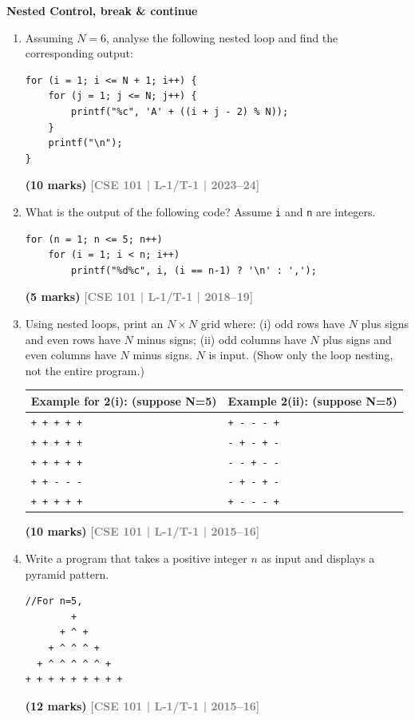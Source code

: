 \documentclass[12pt,a3paper]{article}
\newcommand{\yr}[1]{\hfill\textcolor{gray}{\small\textbf{[#1]}}}
\newcommand{\mk}[1]{\textcolor{orange!70!black}{\small\textbf{(#1 marks)}}}
\newcommand{\subtopic}[2]{%
  \vspace{10pt}
  \noindent\begin{tcolorbox}[colback=#1!8,colframe=#1,boxrule=0.6pt,arc=4pt,
    left=6pt,right=6pt,top=4pt,bottom=4pt]
    \small\bfseries\textcolor{#1}{#2}
  \end{tcolorbox}
  \vspace{2pt}
}
\begin{document}
\subtopic{cA}{Nested Control, break \& continue}
\label{sub:s2-nested}

\begin{enumerate}


\item Assuming $N = 6$, analyse the following nested loop and find the corresponding output:
 
\begin{lstlisting}
for (i = 1; i <= N + 1; i++) {
    for (j = 1; j <= N; j++) {
        printf("%c", 'A' + ((i + j - 2) % N));
    }
    printf("\n");
}
\end{lstlisting}
\mk{10} \yr{CSE 101 | L-1/T-1 | 2023--24}

\item What is the output of the following code? Assume \texttt{i} and \texttt{n} are integers.
 
\begin{lstlisting}
for (n = 1; n <= 5; n++)
    for (i = 1; i < n; i++)
        printf("%d%c", i, (i == n-1) ? '\n' : ',');
\end{lstlisting}
\mk{5} \yr{CSE 101 | L-1/T-1 | 2018--19}

\item Using nested loops, print an $N \times N$ grid where: (i) odd rows have $N$ plus signs and even rows have $N$ minus signs; (ii) odd columns have $N$ plus signs and even columns have $N$ minus signs. $N$ is input. (Show only the loop nesting, not the entire program.)
\begin{center}
  \begin{center}
\begin{tabular}{|l|l|}
\hline
\textbf{Example for 2(i): (suppose N=5)} & \textbf{Example 2(ii): (suppose N=5)} \\
\hline
\texttt{+ + + + +} & \texttt{+ - - - +} \\
\texttt{+ + + + +} & \texttt{- + - + -} \\
\texttt{+ + + + +} & \texttt{- - + - -} \\
\texttt{+ + - - -} & \texttt{- + - + -} \\
\texttt{+ + + + +} & \texttt{+ - - - +} \\
\hline
\end{tabular}
\end{center}
\end{center}
\mk{10} \yr{CSE 101 | L-1/T-1 | 2015--16}

\item Write a program that takes a positive integer $n$ as input and displays a pyramid pattern.
\begin{center}
\begin{lstlisting}
//For n=5,
        +
      + ^ +
    + ^ ^ ^ +
  + ^ ^ ^ ^ ^ +
+ + + + + + + + +
\end{lstlisting}
\end{center}
\mk{12} \yr{CSE 101 | L-1/T-1 | 2015--16}


\end{enumerate}
\end{document}
